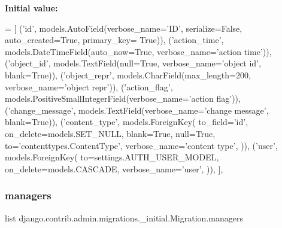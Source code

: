 {\bfseries Initial value\+:}
\begin{DoxyCode}
= [
                (\textcolor{stringliteral}{'id'}, models.AutoField(verbose\_name=\textcolor{stringliteral}{'ID'}, serialize=\textcolor{keyword}{False}, auto\_created=\textcolor{keyword}{True}, primary\_key=\textcolor{keyword}{
      True})),
                (\textcolor{stringliteral}{'action\_time'}, models.DateTimeField(auto\_now=\textcolor{keyword}{True}, verbose\_name=\textcolor{stringliteral}{'action time'})),
                (\textcolor{stringliteral}{'object\_id'}, models.TextField(null=\textcolor{keyword}{True}, verbose\_name=\textcolor{stringliteral}{'object id'}, blank=\textcolor{keyword}{True})),
                (\textcolor{stringliteral}{'object\_repr'}, models.CharField(max\_length=200, verbose\_name=\textcolor{stringliteral}{'object repr'})),
                (\textcolor{stringliteral}{'action\_flag'}, models.PositiveSmallIntegerField(verbose\_name=\textcolor{stringliteral}{'action flag'})),
                (\textcolor{stringliteral}{'change\_message'}, models.TextField(verbose\_name=\textcolor{stringliteral}{'change message'}, blank=\textcolor{keyword}{True})),
                (\textcolor{stringliteral}{'content\_type'}, models.ForeignKey(
                    to\_field=\textcolor{stringliteral}{'id'},
                    on\_delete=models.SET\_NULL,
                    blank=\textcolor{keyword}{True}, null=\textcolor{keyword}{True},
                    to=\textcolor{stringliteral}{'contenttypes.ContentType'},
                    verbose\_name=\textcolor{stringliteral}{'content type'},
                )),
                (\textcolor{stringliteral}{'user'}, models.ForeignKey(
                    to=settings.AUTH\_USER\_MODEL,
                    on\_delete=models.CASCADE,
                    verbose\_name=\textcolor{stringliteral}{'user'},
                )),
            ],
\end{DoxyCode}
\mbox{\label{classdjango_1_1contrib_1_1admin_1_1migrations_1_10001__initial_1_1_migration_a2e0d66bed4d1cc4a280e897d067b8610}} 
\subsubsection{\texorpdfstring{managers}{managers}}
{\footnotesize\ttfamily list django.\+contrib.\+admin.\+migrations.\+\_\+initial.\+Migration.\+managers\hspace{0.3cm}{\ttfamily [static]}}

